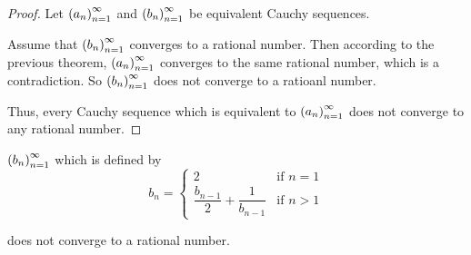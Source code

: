 \begin{proof}
    Let ${\left({a_{n}}\right)}^{\infty}_{n=1}$ and ${\left({b_{n}}\right)}^{\infty}_{n=1}$ be equivalent Cauchy sequences.

    Assume that ${\left({b_{n}}\right)}^{\infty}_{n=1}$ converges to a rational number. Then according to the previous theorem, ${\left({a_{n}}\right)}^{\infty}_{n=1}$ converges to the same rational number, which is a contradiction. So ${\left({b_{n}}\right)}^{\infty}_{n=1}$ does not converge to a ratioanl number.

    Thus, every Cauchy sequence which is equivalent to ${\left({a_{n}}\right)}^{\infty}_{n=1}$ does not converge to any rational number.
\end{proof}

\begin{example}
    ${\left({b_{n}}\right)}^{\infty}_{n=1}$ which is defined by
    \[
        b_{n} =
        \begin{cases}
            2                                       & \text{if $n = 1$} \\
            \dfrac{b_{n-1}}{2} + \dfrac{1}{b_{n-1}} & \text{if $n > 1$}
        \end{cases}
    \]

    does not converge to a rational number.
\end{example}

